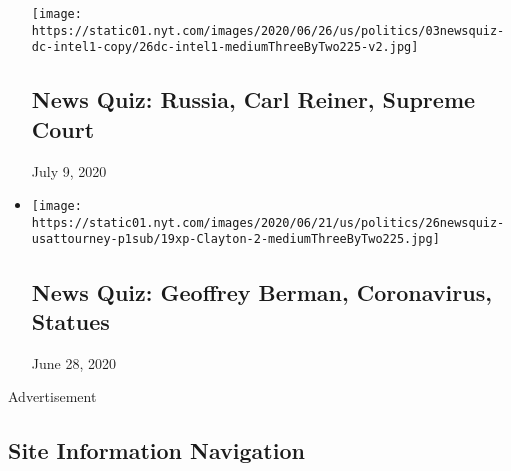 \begin{itemize}
  \texttt{[image: https://static01.nyt.com/images/2020/06/26/us/politics/03newsquiz-dc-intel1-copy/26dc-intel1-mediumThreeByTwo225-v2.jpg]}

  \hypertarget{news-quiz-russia-carl-reiner-supreme-court}{%
  \subsection{News Quiz: Russia, Carl Reiner, Supreme
  Court}\label{news-quiz-russia-carl-reiner-supreme-court}}

  July 9, 2020
\item
  \href{https://www.nytimes.com/interactive/2020/06/26/briefing/geoffrey-berman-coronavirus-statues-news-quiz.html}{}

  \texttt{[image: https://static01.nyt.com/images/2020/06/21/us/politics/26newsquiz-usattourney-p1sub/19xp-Clayton-2-mediumThreeByTwo225.jpg]}

  \hypertarget{news-quiz-geoffrey-berman-coronavirus-statues}{%
  \subsection{News Quiz: Geoffrey Berman, Coronavirus,
  Statues}\label{news-quiz-geoffrey-berman-coronavirus-statues}}

  June 28, 2020
\end{itemize}

Advertisement

\hypertarget{site-information-navigation}{%
\subsection{Site Information
Navigation}\label{site-information-navigation}}

